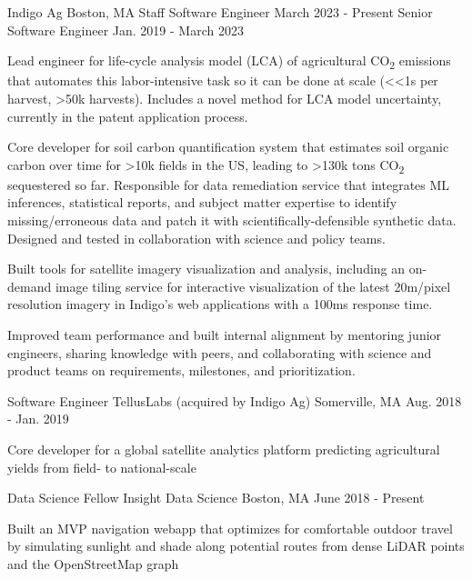 \documentclass[11pt, a4paper]{awesome-cv}
\begin{document}
\begin{cventries}

  \cventrydouble
    {Indigo Ag}  %
    {Boston, MA}  %
    {Staff Software Engineer}  %
    {March 2023 - Present}  %
    {Senior Software Engineer}  %
    {Jan. 2019 - March 2023}  %
    {
    \begin{cvitems}
      \item Lead engineer for life-cycle analysis model (LCA) of agricultural CO\textsubscript{2} emissions that automates this labor-intensive task so it can be done at scale (<<1s per harvest, >50k harvests). Includes a novel method for LCA model uncertainty, currently in the patent application process. 
      \item Core developer for soil carbon quantification system that estimates soil organic carbon over time for >10k fields in the US, leading to >130k tons CO\textsubscript{2} sequestered so far. Responsible for data remediation service that integrates ML inferences, statistical reports, and subject matter expertise to identify missing/erroneous data and patch it with scientifically-defensible synthetic data. Designed and tested in collaboration with science and policy teams.
      \item Built tools for satellite imagery visualization and analysis, including an on-demand image tiling service for interactive visualization of the latest 20m/pixel resolution imagery in Indigo’s web applications with a 100ms response time.
      \item Improved team performance and built internal alignment by mentoring junior engineers, sharing knowledge with peers, and collaborating with science and product teams on requirements, milestones, and prioritization.
    \end{cvitems}
    }

  \cventrytight
    {Software Engineer}
    {TellusLabs (acquired by Indigo Ag)}
    {Somerville, MA}
    {Aug. 2018 - Jan. 2019}
    {
    \begin{cvitems}
      \item Core developer for a global satellite analytics platform predicting agricultural yields from field- to national-scale
    \end{cvitems}
    }

  \cventrytight
    {Data Science Fellow}
    {Insight Data Science}
    {Boston, MA}
    {June 2018 - Present}
    {
    \begin{cvitems}
      \item Built an MVP navigation webapp that optimizes for comfortable outdoor travel by simulating sunlight and shade along potential routes from dense LiDAR points and the OpenStreetMap graph
    \end{cvitems}
    }


\end{cventries}
\end{document}
